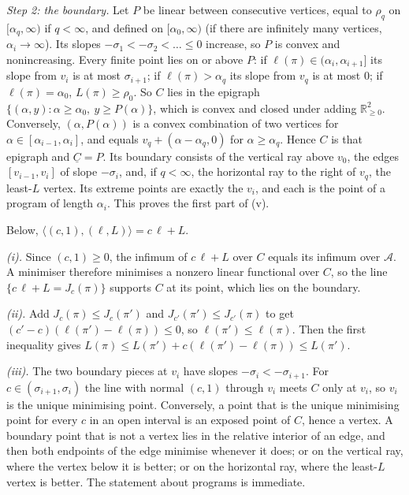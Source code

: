 \emph{Step 2: the boundary.} Let $P$ be linear between consecutive vertices, equal to $\rho_q$ on $[\alpha_q,\infty)$ if $q<\infty$, and defined on $[\alpha_0,\infty)$ (if there are infinitely many vertices, $\alpha_i\to\infty$). Its slopes $-\sigma_1<-\sigma_2<\dots\le0$ increase, so $P$ is convex and nonincreasing. Every finite point lies on or above $P$: if $\ell(\pi)\in(\alpha_i,\alpha_{i+1}]$ its slope from $v_i$ is at most $\sigma_{i+1}$; if $\ell(\pi)>\alpha_q$ its slope from $v_q$ is at most $0$; if $\ell(\pi)=\alpha_0$, $L(\pi)\ge\rho_0$. So $C$ lies in the epigraph $\{(\alpha,y):\alpha\ge\alpha_0,\ y\ge P(\alpha)\}$, which is convex and closed under adding $\mathbb R^2_{\ge0}$. Conversely, $(\alpha,P(\alpha))$ is a convex combination of two vertices for $\alpha\in[\alpha_{i-1},\alpha_i]$, and equals $v_q+(\alpha-\alpha_q,0)$ for $\alpha\ge\alpha_q$. Hence $C$ is that epigraph and $\underline C=P$. Its boundary consists of the vertical ray above $v_0$, the edges $[v_{i-1},v_i]$ of slope $-\sigma_i$, and, if $q<\infty$, the horizontal ray to the right of $v_q$, the least-$L$ vertex. Its extreme points are exactly the $v_i$, and each is the point of a program of length $\alpha_i$. This proves the first part of (v).

Below, $\langle(c,1),(\ell,L)\rangle=c\,\ell+L$.

\emph{(i).} Since $(c,1)\ge0$, the infimum of $c\,\ell+L$ over $C$ equals its infimum over $\mathcal A$. A minimiser therefore minimises a nonzero linear functional over $C$, so the line $\{c\,\ell+L=J_c(\pi)\}$ supports $C$ at its point, which lies on the boundary.

\emph{(ii).} Add $J_c(\pi)\le J_c(\pi')$ and $J_{c'}(\pi')\le J_{c'}(\pi)$ to get $(c'-c)(\ell(\pi')-\ell(\pi))\le0$, so $\ell(\pi')\le\ell(\pi)$. Then the first inequality gives $L(\pi)\le L(\pi')+c(\ell(\pi')-\ell(\pi))\le L(\pi')$.

\emph{(iii).} The two boundary pieces at $v_i$ have slopes $-\sigma_i<-\sigma_{i+1}$. For $c\in(\sigma_{i+1},\sigma_i)$ the line with normal $(c,1)$ through $v_i$ meets $C$ only at $v_i$, so $v_i$ is the unique minimising point. Conversely, a point that is the unique minimising point for every $c$ in an open interval is an exposed point of $C$, hence a vertex. A boundary point that is not a vertex lies in the relative interior of an edge, and then both endpoints of the edge minimise whenever it does; or on the vertical ray, where the vertex below it is better; or on the horizontal ray, where the least-$L$ vertex is better. The statement about programs is immediate.

